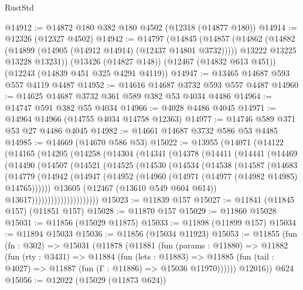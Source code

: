 \begin{lexlean}{RustStd}
\begin{coremodule}
@14912 := @14872 @180 @382 @180 @4502 (@12318 (@14877 @180))
@14914 := @12326 (@12327 @4502)
@14942 := @14797
    (@14845
      (@14857
        (@14862 (@14882 (@14899 (@14905 (@14912 @14914) (@12437 @14801 @3732)))))
        @13222
        @13225
        @13228
        @13231))
    (@13426 (@14827 @148))
    (@12467 (@14832 @613 @451))
    (@12243 (@14839 @451 @325 @4291 @4119))
@14947 := @13465 @14687 @593 @557 @4119 @4487
@14952 := @14616 @14687 @3732 @593 @557 @4487
@14960 := @14625 @14687 @3732 @361 @589 @382 @53 @4034 @4486
@14964 := @14747 @591 @382 @55 @4034
@14966 := @4028 @4486 @4045
@14971 := @14964 @14966 (@14755 @4034 @14758 @12363)
@14977 := @14746 @589 @371 @53 @27 @4486 @4045
@14982 := @14661 @14687 @3732 @586 @53 @4485
@14985 := @14669 (@14670 @586 @53)
@15022 := @13955
    (@14071
      (@14122
        (@14165
          (@14205
            (@14258
              (@14304
                (@14341
                  (@14378
                    (@14411
                      (@14441
                        (@14469
                          (@14490
                            (@14507
                              (@14521
                                (@14525
                                  (@14530
                                    (@14534
                                      (@14538
                                        (@14587
                                          (@14683
                                            (@14779
                                              (@14942
                                                (@14947
                                                  (@14952
                                                    (@14960
                                                      (@14971 (@14977 (@14982 @14985) @14765))))))
                                              @13605
                                              (@12467 (@13610 @549 @604 @614))
                                              @13617)))))))))))))))))))))
@15023 := @11839 @157
@15027 := @11841 (@11845 @157) (@11851 @157)
@15028 := @11870 @157
@15029 := @11860 @15028
@15031 := @11856 (@15029 @11875)
@15033 := @11898 (@11899 @157)
@15034 := @11894 @15033
@15036 := @11856 (@15034 @11923)
@15053 := @11855
    (fun (fn : @302) =>
    @15031
      (@11878
        (@11881
          (fun (params : @11880) =>
          @11882
            (fun (rty : @3431) =>
            @11884
              (fun (lets : @11883) =>
              @11885 (fun (tail : @4027) => @11887 (fun (Γ : @11886) => @15036 @11970))))))
        @12016))
    @624
@15056 := @12022 (@15029 (@11873 @624))

\end{coremodule}
\end{lexlean}
